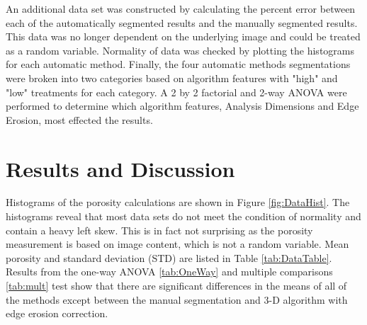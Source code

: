 \documentclass[11pt, twocolumn]{article}
\begin{document}
An additional data set was constructed by calculating the percent error between each of the automatically segmented results and the manually segmented results. This data was no longer dependent on the underlying image and could be treated as a random variable. Normality of data was checked by plotting the histograms for each automatic method. Finally, the four automatic methods segmentations were broken into two categories based on algorithm features with "high" and "low" treatments for each category. A 2 by 2 factorial and 2-way ANOVA were performed to determine which algorithm features, Analysis Dimensions and Edge Erosion, most effected the results. 

\section{Results and Discussion}
Histograms of the porosity calculations are shown in Figure \ref{fig:DataHist}. The histograms reveal that most data sets do not meet the condition of normality and contain a heavy left skew. This is in fact not surprising as the porosity measurement is based on image content, which is not a random variable. Mean porosity and standard deviation (STD) are listed in Table \ref{tab:DataTable}. Results from the one-way ANOVA \ref{tab:OneWay} and multiple comparisons \ref{tab:mult} test show that there are significant differences in the means of all of the methods except between the manual segmentation and 3-D algorithm with edge erosion correction. 
\end{document}
